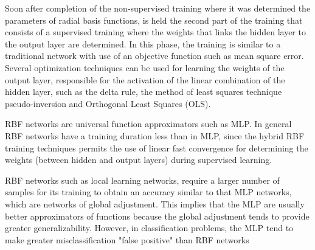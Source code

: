 Soon after completion of the non-supervised training where it was determined the parameters of radial basis functions, is held the second part of the training that consists of a supervised training where the weights that links the hidden layer to the output layer are determined. In this phase, the training is similar to a traditional network with use of an objective function such as mean square error. Several optimization techniques can be used for learning the weights of the output layer, responsible for the activation of the linear combination of the hidden layer, such as the delta rule, the method of least squares technique pseudo-inversion and Orthogonal Least Squares (OLS).

RBF networks are universal function approximators such as MLP. In general RBF networks have a training duration less than in MLP, since the hybrid RBF training techniques permits the use of linear fast convergence for determining the weights (between hidden and output layers) during supervised learning.

RBF networks such as local learning networks, require a larger number of samples for its training to obtain an accuracy similar to that MLP networks, which are networks of global adjustment. This implies that the MLP are usually better approximators of functions because the global adjustment tends to provide greater generalizability. However, in classification problems, the MLP tend to make greater misclassification "false positive" than RBF networks


